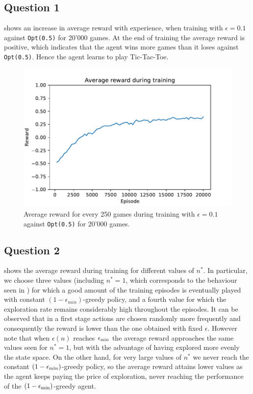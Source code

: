 \documentclass[10pt]{IEEEtran}
\begin{document}
\subsection*{Question 1}
 shows an increase in average reward with experience, when training with $\epsilon = 0.1$ against \texttt{Opt(0.5)} for 20'000 games. At the end of training the average reward is positive, which indicates that the agent wins more games than it loses against \texttt{Opt(0.5)}. Hence the agent learns to play Tic-Tac-Toe.
\begin{figure}[H]
    \centering
    \includegraphics[width = 0.85\linewidth]{code/figures/rewards_Q1.pdf}
    \caption{Average reward for every 250 games during training with $\epsilon = 0.1$ against \texttt{Opt(0.5)} for 20'000 games.}
    \label{plot_question1}
\end{figure}

\subsection*{Question 2}
 shows the average reward during training for different values of $n^{*}$. In particular, we choose three values (including $n^* = 1$, which corresponds to the behaviour seen in ) for which a good amount of the training episodes is eventually played with constant $(1-\epsilon_{min})$-greedy policy, and a fourth value for which the exploration rate remains considerably high throughout the episodes. It can be observed that in a first stage actions are chosen randomly more frequently and consequently the reward is lower than the one obtained with fixed $\epsilon$. However note that when $\epsilon(n)$ reaches $\epsilon_{\text{min}}$ the average reward approaches the same values seen for $n^{*} = 1$, but with the advantage of having explored more evenly the state space. On the other hand, for very large values of $n^*$ we never reach the constant $(1-\epsilon_{\text{min}})$-greedy policy, so the average reward attains lower values as the agent keeps paying the price of exploration, never reaching the performance of the $(1-\epsilon_{\text{min}})$-greedy agent. 
\end{document}
